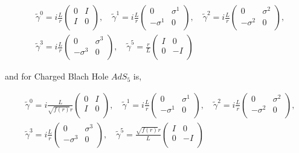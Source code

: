 \begin{align} \label{eq:GammaMetricesMinkowski5d}
   &\tilde{\gamma}^0 = i\frac{L}{r}\begin{pmatrix} 0 & I \\ I & 0 \\ \end{pmatrix}, \quad
   \tilde{\gamma}^1  = i\frac{L}{r}\begin{pmatrix} 0 & \sigma^1 \\ -\sigma^1 & 0 \\ \end{pmatrix}, \quad
   \tilde{\gamma}^2  = i\frac{L}{r}\begin{pmatrix} 0 & \sigma^2 \\ -\sigma^2 & 0 \\ \end{pmatrix}, \nonumber\\
   &\tilde{\gamma}^3 = i\frac{L}{r}\begin{pmatrix} 0 & \sigma^3 \\ -\sigma^3 & 0 \\ \end{pmatrix}, \quad
   \tilde{\gamma}^5  =  \frac{r}{L}\begin{pmatrix} I & 0 \\ 0 & -I \\ \end{pmatrix}
\end{align}

and for Charged Blach Hole $AdS_5$ is,

\begin{align} \label{eq:GammaMetricesMinkowski5d}
   &\tilde{\gamma}^0 = i\frac{L}{\sqrt{f(r)}r}\begin{pmatrix} 0 & I \\ I & 0 \\ \end{pmatrix}, \quad
   \tilde{\gamma}^1  = i\frac{L}{r}\begin{pmatrix} 0 & \sigma^1 \\ -\sigma^1 & 0 \\ \end{pmatrix}, \quad
   \tilde{\gamma}^2  = i\frac{L}{r}\begin{pmatrix} 0 & \sigma^2 \\ -\sigma^2 & 0 \\ \end{pmatrix}, \nonumber\\
   &\tilde{\gamma}^3 = i\frac{L}{r}\begin{pmatrix} 0 & \sigma^3 \\ -\sigma^3 & 0 \\ \end{pmatrix}, \quad
   \tilde{\gamma}^5  =  \frac{\sqrt{f(r)}r}{L}\begin{pmatrix} I & 0 \\ 0 & -I \\ \end{pmatrix}
\end{align}

